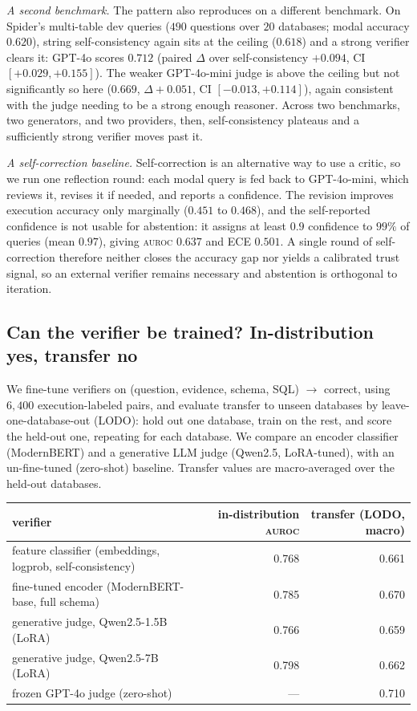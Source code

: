 \documentclass[11pt]{article}
\newcommand{\auroc}{\textsc{auroc}}
\begin{document}
\textit{A second benchmark.} The pattern also reproduces on a different benchmark. On Spider's
multi-table dev queries ($490$ questions over $20$ databases; modal accuracy $0.620$), string
self-consistency again sits at the ceiling ($0.618$) and a strong verifier clears it: GPT-4o scores
$0.712$ (paired $\Delta$ over self-consistency $+0.094$, CI $[+0.029, +0.155]$). The weaker GPT-4o-mini
judge is above the ceiling but not significantly so here ($0.669$, $\Delta +0.051$, CI
$[-0.013, +0.114]$), again consistent with the judge needing to be a strong enough reasoner. Across
two benchmarks, two generators, and two providers, then, self-consistency plateaus and a sufficiently
strong verifier moves past it.

\textit{A self-correction baseline.} Self-correction is an alternative way to use a critic, so we run
one reflection round: each modal query is fed back to GPT-4o-mini, which reviews it, revises it if
needed, and reports a confidence. The revision improves execution accuracy only marginally ($0.451$
to $0.468$), and the self-reported confidence is not usable for abstention: it assigns at least $0.9$
confidence to $99\%$ of queries (mean $0.97$), giving \auroc{} $0.637$ and ECE $0.501$. A single
round of self-correction therefore neither closes the accuracy gap nor yields a calibrated trust
signal, so an external verifier remains necessary and abstention is orthogonal to iteration.

\subsection{Can the verifier be trained? In-distribution yes, transfer no}
\label{sec:trained}
We fine-tune verifiers on (question, evidence, schema, SQL) $\rightarrow$ correct, using $6{,}400$
execution-labeled pairs, and evaluate transfer to unseen databases by leave-one-database-out (LODO):
hold out one database, train on the rest, and score the held-out one, repeating for each database.
We compare an encoder classifier (ModernBERT) and a generative LLM judge (Qwen2.5, LoRA-tuned), with
an un-fine-tuned (zero-shot) baseline. Transfer values are macro-averaged over the held-out databases.
\begin{table}[h]\centering
\begin{tabular}{lrr}
\toprule
verifier & in-distribution \auroc{} & transfer (LODO, macro) \\
\midrule
feature classifier (embeddings, logprob, self-consistency) & 0.768 & 0.661 \\
fine-tuned encoder (ModernBERT-base, full schema) & 0.785 & 0.670 \\
generative judge, Qwen2.5-1.5B (LoRA) & 0.766 & 0.659 \\
generative judge, Qwen2.5-7B (LoRA) & 0.798 & 0.662 \\
frozen GPT-4o judge (zero-shot) & --- & 0.710 \\
\bottomrule
\end{tabular}
\end{table}
\end{document}
